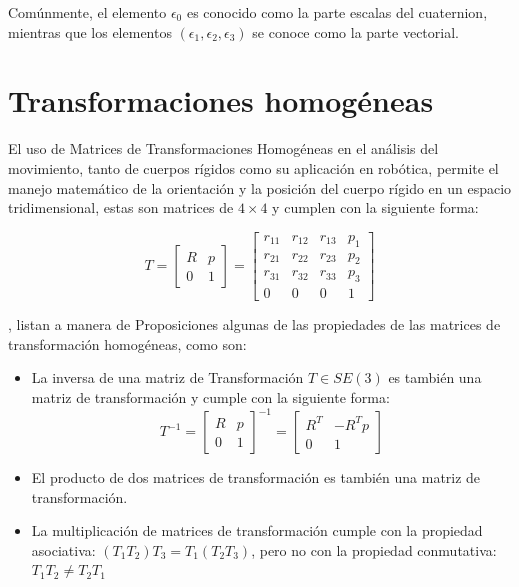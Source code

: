 Comúnmente, el elemento $\epsilon_{0}$ es conocido como la parte escalas del cuaternion, mientras que los elementos $(\epsilon_{1},\epsilon_{2}, \epsilon_{3})$ se conoce como la parte vectorial.

\section{Transformaciones homogéneas}

El uso de Matrices de Transformaciones Homogéneas en el análisis del movimiento, tanto de cuerpos rígidos como su aplicación en robótica, permite el manejo matemático de la orientación y la posición del cuerpo rígido en un espacio tridimensional, estas son matrices de $4 \times 4$ y cumplen con la siguiente forma:



\begin{equation}
	T = 
    \begin{bmatrix}
	R & p\\
	0 & 1 
	\end{bmatrix} = 
    \begin{bmatrix}
	r_{11} & r_{12} & r_{13} & p_{1}\\
	r_{21} & r_{22} & r_{23} & p_{2}\\
	r_{31} & r_{32} & r_{33} & p_{3}\\
	0 & 0 & 0 & 1 
	\end{bmatrix}
    \label{eqn:Mtx_HomoTrans}
\end{equation}

\newpage
\cite{lynch_modern_2017}, listan a manera de Proposiciones algunas de las propiedades de las matrices de transformación homogéneas, como son:


\begin{itemize}
    \item La inversa de una matriz de Transformación $T \in SE(3)$ es también una matriz de transformación y cumple con la siguiente forma:
    \begin{equation}
        T^{-1} = 
    \begin{bmatrix}
	R & p\\
	0 & 1 
	\end{bmatrix}^{-1} = 
    \begin{bmatrix}
	R^{T} & -R^{T}p\\
	0 & 1 
	\end{bmatrix}
    \label{eqn:Mtx_HT_Inv}
    \end{equation}
    \item El producto de dos matrices de transformación es también una matriz de transformación.
    \item La multiplicación de matrices de transformación cumple con la propiedad asociativa: $(T_{1}T_{2})T_{3}=T_{1}(T_{2}T_{3})$, pero no con la propiedad conmutativa: $T_{1}T_{2}\neq T_{2}T_{1}$  
\end{itemize}

